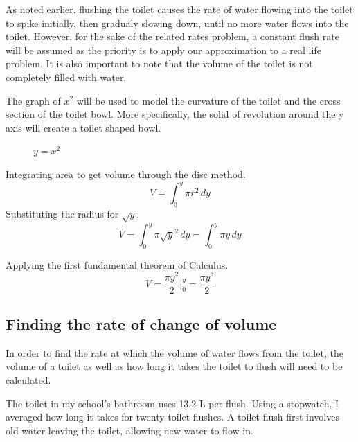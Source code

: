 \documentclass[12pt, titlepage]{article}
\begin{document}
As noted earlier, flushing the toilet causes the rate of water flowing into the toilet to spike initially, then gradualy slowing down, until no more water flows into the toilet. However, for the sake of the related rates problem, a constant flush rate will be assumed as the priority is to apply our approximation to a real life problem. It is also important to note that the volume of the toilet is not completely filled with water.  

The graph of \(x^{2}\) will be used to model the curvature of the toilet and the cross section of the toilet bowl. More specifically, the solid of revolution around the y axis will create a toilet shaped bowl. 

\begin{figure}[H]
\centering
    \caption[]{\(y=x^2\)}
\end{figure}

Integrating area to get volume through the disc method.
\begin{equation}
    V = \int^y_0 \pi r^2\,dy
\end{equation}
Substituting the radius for \(\sqrt{y}\).
\begin{equation}
    V = \int^y_0 \pi \sqrt{y}^2\,dy  = \int^y_0 \pi y\,dy 
\end{equation}

Applying the first fundamental theorem of Calculus.
\begin{equation}
    V = \frac{ \pi y^2 }{2} \biggr \rvert^y_0 = \frac{\pi y^3}{2}
\end{equation}

\subsection{Finding the rate of change of volume}
In order to find the rate at which the volume of water flows from the toilet, the volume of a toilet as well as how long it takes the toilet to flush will need to be calculated. 

\pagebreak
The toilet in my school’s bathroom uses 13.2 L per flush. Using a stopwatch, I averaged how long it takes for twenty toilet flushes. A toilet flush first involves old water leaving the toilet, allowing new water to flow in. 
\end{document}
